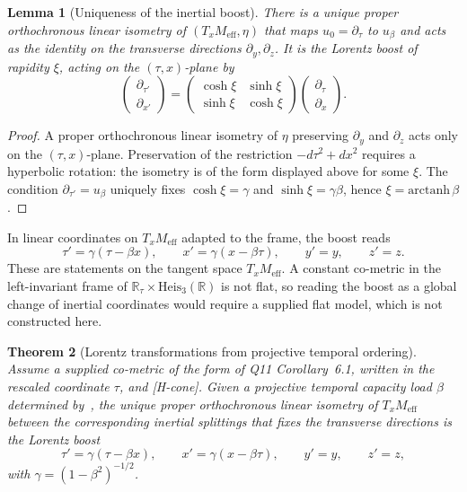 \documentclass[12pt,a4paper]{article}
\newtheorem{theorem}{Theorem}[section]
\newtheorem{lemma}[theorem]{Lemma}
\theoremstyle{remark}
\theoremstyle{definition}
\newcommand{\Meff}{M_{\mathrm{eff}}}
\begin{document}
    \begin{lemma}[Uniqueness of the inertial boost]
      \label{lem:boost-uniqueness}
      There is a unique proper orthochronous linear isometry of $(T_x\Meff, \eta)$ that
      maps $u_0 = \partial_\tau$ to $u_\beta$ and acts as the identity on the transverse
      directions $\partial_y, \partial_z$.
      It is the Lorentz boost of rapidity $\xi$, acting on the $(\tau,x)$-plane by
      \[
        \begin{pmatrix} \partial_{\tau'} \\ \partial_{x'} \end{pmatrix}
        =
        \begin{pmatrix} \cosh\xi & \sinh\xi \\ \sinh\xi & \cosh\xi \end{pmatrix}
        \begin{pmatrix} \partial_\tau \\ \partial_x \end{pmatrix}.
      \]
    \end{lemma}

    \begin{proof}
      A proper orthochronous linear isometry of $\eta$ preserving $\partial_y$ and
      $\partial_z$ acts only on the $(\tau,x)$-plane.
      Preservation of the restriction $-d\tau^2 + dx^2$ requires a hyperbolic rotation:
      the isometry is of the form displayed above for some $\xi$.
      The condition $\partial_{\tau'} = u_\beta$ uniquely fixes
      $\cosh\xi = \gamma$ and $\sinh\xi = \gamma\beta$,
      hence $\xi = \mathrm{arctanh}\,\beta$.
    \end{proof}

    In linear coordinates on $T_x\Meff$ adapted to the frame, the boost reads
    \[
      \tau' = \gamma(\tau - \beta x), \qquad
      x'   = \gamma(x  - \beta\tau), \qquad
      y'   = y,                      \qquad
      z'   = z.
    \]
    These are statements on the tangent space $T_x\Meff$.
    A constant co-metric in the left-invariant frame of $\mathbb{R}_\tau \times \mathrm{Heis}_3(\mathbb{R})$ is not
    flat, so reading the boost as a global change of inertial coordinates would require a supplied flat model, which
    is not constructed here.

    \begin{theorem}[Lorentz transformations from projective temporal ordering]
      \label{thm:lorentz-from-pto}
      Assume a supplied co-metric of the form of Q11 Corollary~6.1, written in the rescaled coordinate $\tau$, and
      \textup{[H-cone]}.
      Given a projective temporal capacity load $\beta$ determined by~\cite{Beau2026n,Beau2026tp},
      the unique proper orthochronous linear isometry of $T_x\Meff$ between the corresponding inertial
      splittings that fixes the transverse directions is the Lorentz boost
      \[
        \tau' = \gamma(\tau - \beta x),\qquad
        x'   = \gamma(x  - \beta\tau),\qquad
        y'   = y,\qquad z' = z,
      \]
      with $\gamma = (1-\beta^2)^{-1/2}$.
    \end{theorem}
\end{document}
